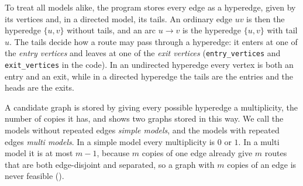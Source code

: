 
To treat all models alike, the program stores every edge as a hyperedge, given by its vertices and, in a directed model, its tails.
An ordinary edge $uv$ is then the hyperedge $\{u,v\}$ without tails, and an arc $u\to v$ is the hyperedge $\{u,v\}$ with tail $u$.
The tails decide how a route may pass through a hyperedge: it enters at one of the \emph{entry vertices} and leaves at one of the \emph{exit vertices} (\texttt{entry\_vertices} and \texttt{exit\_vertices} in the code).
In an undirected hyperedge every vertex is both an entry and an exit, while in a directed hyperedge the tails are the entries and the heads are the exits.

A candidate graph is stored by giving every possible hyperedge a multiplicity, the number of copies it has, and  shows two graphs stored in this way.
We call the models without repeated edges \emph{simple models}, and the models with repeated edges \emph{multi models}.
In a simple model every multiplicity is $0$ or $1$.
In a multi model it is at most $m-1$, because $m$ copies of one edge already give $m$ routes that are both edge-disjoint and separated, so a graph with $m$ copies of an edge is never feasible ().




